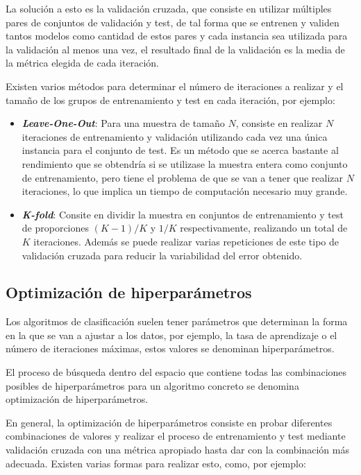 La solución a esto es la validación cruzada, que consiste en utilizar múltiples
pares de conjuntos de validación y test, de tal forma que se entrenen y validen
tantos modelos como cantidad de estos pares y cada instancia sea utilizada para
la validación al menos una vez, el resultado final de la validación es la media
de la métrica elegida de cada iteración.

Existen varios métodos para determinar el número de iteraciones a realizar y el
tamaño de los grupos de entrenamiento y test en cada iteración, por ejemplo:

\begin{itemize}
    \item \textbf{\textit{Leave-One-Out}}: Para una muestra de tamaño $N$,
    consiste en realizar $N$ iteraciones de entrenamiento y validación
    utilizando cada vez una única instancia para el conjunto de test. Es un
    método que se acerca bastante al rendimiento que se obtendría si se
    utilizase la muestra entera como conjunto de entrenamiento, pero tiene el
    problema de que se van a tener que realizar $N$ iteraciones, lo que implica
    un tiempo de computación necesario muy grande.
    \item \textbf{\textit{K-fold}}: Consite en dividir la muestra en conjuntos
    de entrenamiento y test de proporciones $(K-1)/K$ y $1/K$ respectivamente,
    realizando un total de $K$ iteraciones. Además se puede realizar varias
    repeticiones de este tipo de validación cruzada para reducir la variabilidad
    del error obtenido.
\end{itemize}

\subsection{Optimización de hiperparámetros}

Los algoritmos de clasificación suelen tener parámetros que determinan la forma
en la que se van a ajustar a los datos, por ejemplo, la tasa de aprendizaje o el
número de iteraciones máximas, estos valores se denominan hiperparámetros.

El proceso de búsqueda dentro del espacio que contiene todas las combinaciones
posibles de hiperparámetros para un algoritmo concreto se denomina optimización
de hiperparámetros.

En general, la optimización de hiperparámetros consiste en probar diferentes
combinaciones de valores y realizar el proceso de entrenamiento y test mediante
validación cruzada con una métrica apropiado hasta dar con la combinación más
adecuada. Existen varias formas para realizar esto, como, por ejemplo:

